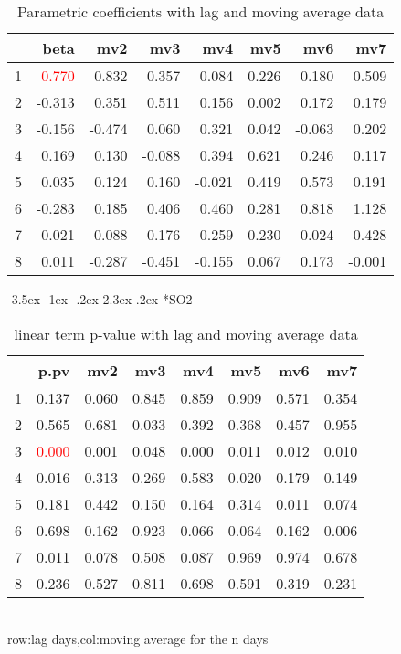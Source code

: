 \documentclass[a4paper, 12pt]{article}
\makeatletter
\def\large{\fontsize{14}{20}\selectfont}
\renewcommand\subsection{\@startsection {subsection}{1}{\z@}%
                                   {-3.5ex \@plus -1ex \@minus -.2ex}%
                                   {2.3ex \@plus.2ex}%
                                   {\centering\normalfont\large\bfseries}}
\makeatother
\begin{document}
\begin{table}[h]
\centering
\caption{Parametric coefficients with lag and moving average data}
\begin{tabular}{rrrrrrrr}
  \hline
 & beta & mv2 & mv3 & mv4 & mv5 & mv6 & mv7 \\
  \hline
1 & \textcolor{red}{0.770} & 0.832 & 0.357 & 0.084 & 0.226 & 0.180 & 0.509 \\
  2 & -0.313 & 0.351 & 0.511 & 0.156 & 0.002 & 0.172 & 0.179 \\
  3 & -0.156 & -0.474 & 0.060 & 0.321 & 0.042 & -0.063 & 0.202 \\
  4 & 0.169 & 0.130 & -0.088 & 0.394 & 0.621 & 0.246 & 0.117 \\
  5 & 0.035 & 0.124 & 0.160 & -0.021 & 0.419 & 0.573 & 0.191 \\
  6 & -0.283 & 0.185 & 0.406 & 0.460 & 0.281 & 0.818 & 1.128 \\
  7 & -0.021 & -0.088 & 0.176 & 0.259 & 0.230 & -0.024 & 0.428 \\
  8 & 0.011 & -0.287 & -0.451 & -0.155 & 0.067 & 0.173 & -0.001 \\
   \hline
\end{tabular}
\end{table}
\clearpage
\subsection*{SO2}
\begin{table}[h]
\centering
\caption{linear term p-value with lag and moving average data}
\begin{tabular}{rrrrrrrr}
  \hline
 & p.pv & mv2 & mv3 & mv4 & mv5 & mv6 & mv7 \\
  \hline
1 & 0.137 & 0.060 & 0.845 & 0.859 & 0.909 & 0.571 & 0.354 \\
  2 & 0.565 & 0.681 & 0.033 & 0.392 & 0.368 & 0.457 & 0.955 \\
  3 & \textcolor{red}{0.000} & 0.001 & 0.048 & 0.000 & 0.011 & 0.012 & 0.010 \\
  4 & 0.016 & 0.313 & 0.269 & 0.583 & 0.020 & 0.179 & 0.149 \\
  5 & 0.181 & 0.442 & 0.150 & 0.164 & 0.314 & 0.011 & 0.074 \\
  6 & 0.698 & 0.162 & 0.923 & 0.066 & 0.064 & 0.162 & 0.006 \\
  7 & 0.011 & 0.078 & 0.508 & 0.087 & 0.969 & 0.974 & 0.678 \\
  8 & 0.236 & 0.527 & 0.811 & 0.698 & 0.591 & 0.319 & 0.231 \\
   \hline
\end{tabular}
\\row:lag days,col:moving average for the n days
\end{table}
\end{document}
